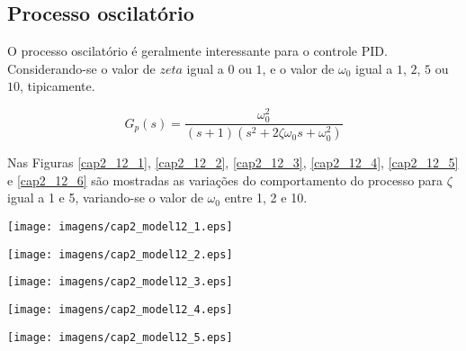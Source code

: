 \subsection{Processo oscilatório}

    O processo oscilatório é geralmente interessante para o controle \acs{PID}.
    Considerando-se o valor de $zeta$ igual a $0$ ou $1$, e o valor de $\omega _0$
    igual a $1$, $2$, $5$ ou $10$, tipicamente.

    \begin{equation}
        G_p(s) = \frac{\omega _0^2}{(s+1)(s^2+2\zeta \omega _0 s+\omega _0^2)}
    \end{equation}
    
    Nas Figuras \ref{cap2_12_1}, \ref{cap2_12_2}, \ref{cap2_12_3}, \ref{cap2_12_4},
    \ref{cap2_12_5} e \ref{cap2_12_6}
    são mostradas as variações do comportamento do processo para $\zeta$
    igual a 1 e 5, variando-se o valor de $\omega _0$ entre 1, 2 e 10.
    
    \begin{center}
        \texttt{[image: imagens/cap2\_model12\_1.eps]}
	\label{cap2_12_1}
    \end{center}
    
    \begin{center}
        \texttt{[image: imagens/cap2\_model12\_2.eps]}
	\label{cap2_12_2}
    \end{center}
    
    \begin{center}
        \texttt{[image: imagens/cap2\_model12\_3.eps]}
	\label{cap2_12_3}
    \end{center}
    
    \begin{center}
        \texttt{[image: imagens/cap2\_model12\_4.eps]}
        \label{cap2_12_4}
    \end{center}
    
    \begin{center}
        \texttt{[image: imagens/cap2\_model12\_5.eps]}
	\label{cap2_12_5}
    \end{center}
    
